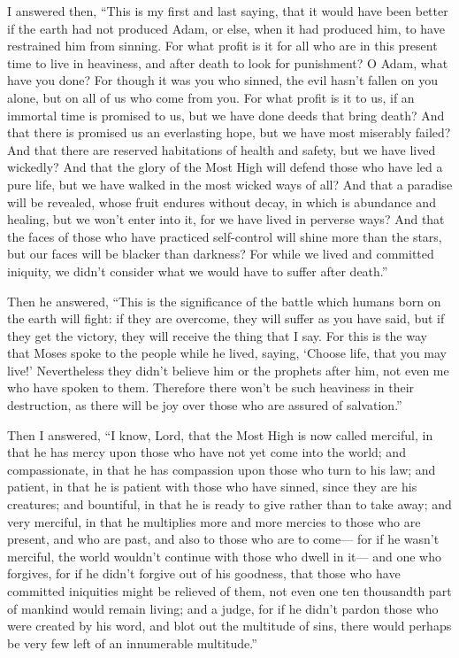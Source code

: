  I answered then, ``This is my first and last saying,
that it would have been better if the earth had not produced Adam, or
else, when it had produced him, to have restrained him from sinning.
 For what profit is it for all who are in this present
time to live in heaviness, and after death to look for punishment?
 O Adam, what have you done? For though it was you who
sinned, the evil hasn't fallen on you alone, but on all of us who come
from you.  For what profit is it to us, if an immortal
time is promised to us, but we have done deeds that bring death?
 And that there is promised us an everlasting hope, but
we have most miserably failed?  And that there are
reserved habitations of health and safety, but we have lived wickedly?
 And that the glory of the Most High will defend those
who have led a pure life, but we have walked in the most wicked ways of
all?  And that a paradise will be revealed, whose fruit
endures without decay, in which is abundance and healing, but we won't
enter into it,  for we have lived in perverse ways?
 And that the faces of those who have practiced
self-control will shine more than the stars, but our faces will be
blacker than darkness?  For while we lived and committed
iniquity, we didn't consider what we would have to suffer after death.''

 Then he answered, ``This is the significance of the
battle which humans born on the earth will fight:  if
they are overcome, they will suffer as you have said, but if they get
the victory, they will receive the thing that I say. 
For this is the way that Moses spoke to the people while he lived,
saying, `Choose life, that you may live!'  Nevertheless
they didn't believe him or the prophets after him, not even me who have
spoken to them.  Therefore there won't be such heaviness
in their destruction, as there will be joy over those who are assured of
salvation.''

 Then I answered, ``I know, Lord, that the Most High is
now called merciful, in that he has mercy upon those who have not yet
come into the world;  and compassionate, in that he has
compassion upon those who turn to his law;  and patient,
in that he is patient with those who have sinned, since they are his
creatures;  and bountiful, in that he is ready to give
rather than to take away;  and very merciful, in that he
multiplies more and more mercies to those who are present, and who are
past, and also to those who are to come---  for if he
wasn't merciful, the world wouldn't continue with those who dwell in
it---  and one who forgives, for if he didn't forgive
out of his goodness, that those who have committed iniquities might be
relieved of them, not even one ten thousandth part of mankind would
remain living;  and a judge, for if he didn't pardon
those who were created by his word, and blot out the multitude of sins,
 there would perhaps be very few left of an innumerable
multitude.''


